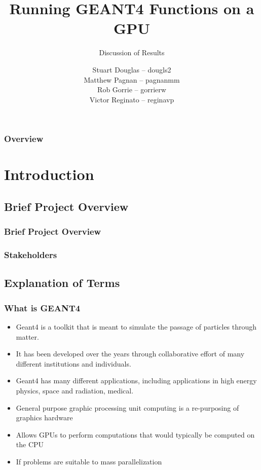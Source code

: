 \documentclass{beamer}
\title[GEANT4-GPU (McMaster University)]{Running GEANT4 Functions on a GPU}
\subtitle{Discussion of Results}
\institute{McMaster University}
\author[S. Douglas, M .Pagnan, R. Gorrie, V. Reginato]{
Stuart Douglas -- dougls2
\\Matthew Pagnan -- pagnanmm
\\Rob Gorrie -- gorrierw
\\Victor Reginato -- reginavp
}
\begin{document}
\frame{\titlepage}
\begin{frame}
\frametitle{Overview}
\tableofcontents
\end{frame}

\section{Introduction} 

\subsection{Brief Project Overview}
\begin{frame}
\frametitle{Brief Project Overview}
\end{frame}

\begin{frame}
\frametitle{Stakeholders}
\end{frame}

\subsection{Explanation of Terms}
\begin{frame}
\frametitle{What is GEANT4}
\begin{itemize}
\item Geant4 is a toolkit that is meant to simulate the passage of particles through matter. 
\item It has been developed over the years through collaborative effort of many different institutions and individuals. 
\item Geant4 has many different applications, including applications in high energy physics, space and radiation, medical. 
\end{itemize}
\end{frame}

\begin{frame}
\begin{itemize}
\frametitle{What is GP-GPU}
\item General purpose graphic processing unit computing is a re-purposing of graphics hardware
\item Allows GPUs  to perform computations that would typically be computed on the CPU
\item If problems are suitable to mass parallelization 
\end{itemize}
\end{frame}
\end{document}
